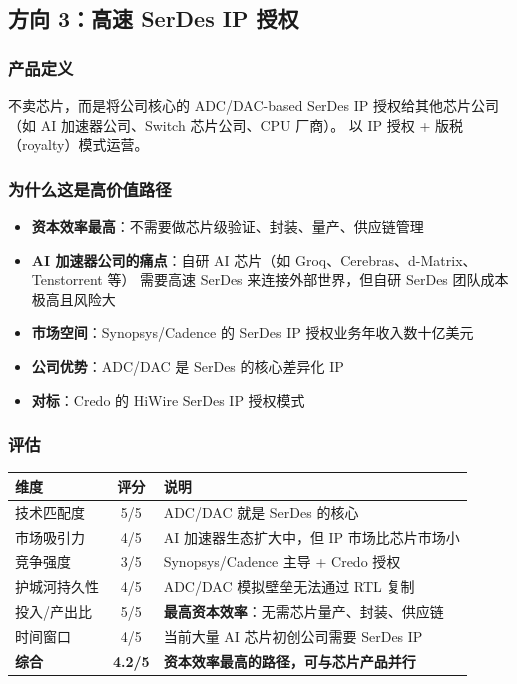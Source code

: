 \documentclass[11pt,a4paper]{ctexart}
\begin{document}
\subsection{方向 3：高速 SerDes IP 授权}

\subsubsection{产品定义}
不卖芯片，而是将公司核心的 ADC/DAC-based SerDes IP 授权给其他芯片公司
（如 AI 加速器公司、Switch 芯片公司、CPU 厂商）。
以 IP 授权 + 版税（royalty）模式运营。

\subsubsection{为什么这是高价值路径}

\begin{itemize}
    \item \textbf{资本效率最高}：不需要做芯片级验证、封装、量产、供应链管理
    \item \textbf{AI 加速器公司的痛点}：自研 AI 芯片（如 Groq、Cerebras、d-Matrix、Tenstorrent 等）
          需要高速 SerDes 来连接外部世界，但自研 SerDes 团队成本极高且风险大
    \item \textbf{市场空间}：Synopsys/Cadence 的 SerDes IP 授权业务年收入数十亿美元
    \item \textbf{公司优势}：ADC/DAC 是 SerDes 的核心差异化 IP
    \item \textbf{对标}：Credo 的 HiWire SerDes IP 授权模式
\end{itemize}

\subsubsection{评估}

\begin{table}[htb]
    \centering
    \begin{tabular}{l c p{}}
        \toprule
        \textbf{维度} & \textbf{评分} & \textbf{说明} \\
        \midrule
        技术匹配度 & 5/5 & ADC/DAC 就是 SerDes 的核心 \\
        市场吸引力 & 4/5 & AI 加速器生态扩大中，但 IP 市场比芯片市场小 \\
        竞争强度 & 3/5 & Synopsys/Cadence 主导 + Credo 授权 \\
        护城河持久性 & 4/5 & ADC/DAC 模拟壁垒无法通过 RTL 复制 \\
        投入/产出比 & 5/5 & \textbf{最高资本效率}：无需芯片量产、封装、供应链 \\
        时间窗口 & 4/5 & 当前大量 AI 芯片初创公司需要 SerDes IP \\
        \midrule
        \rowcolor{strong}
        \textbf{综合} & \textbf{4.2/5} & \textbf{资本效率最高的路径，可与芯片产品并行} \\
        \bottomrule
    \end{tabular}
\end{table}
\end{document}
